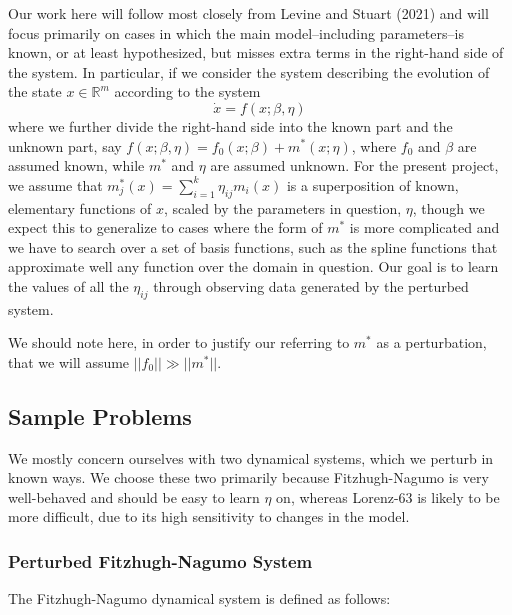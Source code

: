 \documentclass[12pt]{article}
\begin{document}
Our work here will follow most closely from Levine and Stuart (2021) and will focus primarily on cases in which the main model\---including parameters\---is known, or at least hypothesized, but misses extra terms in the right-hand side of the system. In particular, if we consider the system describing the evolution of the state $x \in \mathbb{R}^m$ according to the system $$\dot{x} = f(x;\beta, \eta)$$ where we further divide the right-hand side into the known part and the unknown part, say $f(x;\beta, \eta) = f_0(x; \beta) + m^*(x; \eta)$, where $f_0$ and $\beta$ are assumed known, while $m^*$ and $\eta$ are assumed unknown. For the present project, we assume that $m_j^*(x) = \sum_{i=1}^k \eta_{ij} m_i(x)$ is a superposition of known, elementary functions of $x$, scaled by the parameters in question, $\eta$, though we expect this to generalize to cases where the form of $m^*$ is more complicated and we have to search over a set of basis functions, such as the spline functions that approximate well any function over the domain in question. Our goal is to learn the values of all the $\eta_{ij}$ through observing data generated by the perturbed system.

We should note here, in order to justify our referring to $m^*$ as a perturbation, that we will assume $||f_0|| \gg ||m^*||$.


\subsection{Sample Problems}

We mostly concern ourselves with two dynamical systems, which we perturb in known ways. We choose these two primarily because Fitzhugh-Nagumo is very well-behaved and should be easy to learn $\eta$ on, whereas Lorenz-63 is likely to be more difficult, due to its high sensitivity to changes in the model.


\subsubsection{Perturbed Fitzhugh-Nagumo System}

The Fitzhugh-Nagumo dynamical system is defined as follows:
\end{document}
